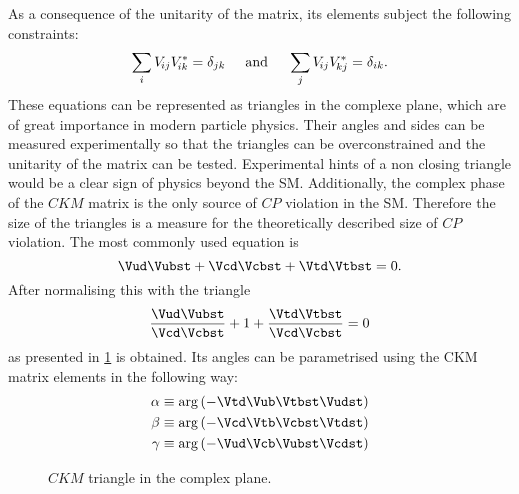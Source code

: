 As a consequence of the unitarity of the matrix, its elements subject the following constraints:
\begin{equation}
\sum_{i} V_{{\kern -0.1em}ij}V_{{\kern -0.1em}ik}^{*} = \delta_{jk}\hspace{0.5cm}\text{and}\hspace{0.5cm}
\sum_{j} V_{{\kern -0.1em}ij}V_{{\kern -0.1em}kj}^{*} = \delta_{ik}.
\end{equation}
These equations can be represented as triangles in the complexe plane, which are of great importance in modern particle physics.
Their angles and sides can be measured experimentally so that the triangles can be overconstrained and the unitarity of the matrix can be tested.
Experimental hints of a non closing triangle would be a clear sign of physics beyond the \ac{SM}.
Additionally, the complex phase of the $CKM$ matrix is the only source of $CP$ violation in the \ac{SM}.
Therefore the size of the triangles is a measure for the theoretically described size of $CP$ violation.
The most commonly used equation is
\begin{equation}
\Vud\Vubst + \Vcd\Vcbst + \Vtd\Vtbst = 0.
\end{equation}
After normalising this with \Vcd\Vcbst the triangle
\begin{equation}
\frac{\Vud\Vubst}{\Vcd\Vcbst} + 1 + \frac{\Vtd\Vtbst}{\Vcd\Vcbst} = 0 \label{eq:CKMtriangle}
\end{equation}
as presented in \cref{fig:ckmtheory} is obtained.
Its angles can be parametrised using the CKM matrix elements in the following way:
\begin{equation}
\begin{aligned}
\alpha&\equiv\arg\left(-\Vtd\Vub\Vtbst\Vudst\right)\\
\beta&\equiv\arg\left(-\Vcd\Vtb\Vcbst\Vtdst\right)\\
\gamma&\equiv\arg\left(-\Vud\Vcb\Vubst\Vcdst\right)\label{eq:CKMangles}
\end{aligned}
\end{equation}
\begin{figure}[tbp]
	\centering
	
	\caption{$CKM$ triangle in the complex plane.}
	\label{fig:ckmtheory}
\end{figure}
